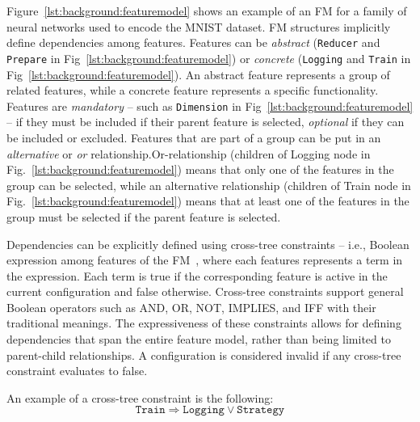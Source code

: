 Figure~\ref{lst:background:featuremodel} shows an example of an FM for a family of neural networks used to encode the MNIST dataset.
FM structures implicitly define dependencies among features. Features can be \textit{abstract} (\texttt{Reducer} and \texttt{Prepare} in Fig~\ref{lst:background:featuremodel}) or \textit{concrete} (\texttt{Logging} and \texttt{Train} in Fig~\ref{lst:background:featuremodel}).
An abstract feature represents a group of related features, while a concrete feature represents a specific functionality.
Features are \textit{mandatory} -- such as \texttt{Dimension} in Fig~\ref{lst:background:featuremodel} -- if they must be included if their parent feature is selected, \textit{optional} if they can be included or excluded.
Features that are part of a group can be put in an \textit{alternative} or \textit{or} relationship.Or-relationship (children of Logging node in Fig.~\ref{lst:background:featuremodel}) means that only one of the features in the group can be selected, while an alternative relationship (children of Train node in Fig.~\ref{lst:background:featuremodel}) means that at least one of the features in the group must be selected if the parent feature is selected.

Dependencies can be explicitly defined using cross-tree constraints -- i.e., Boolean expression among features of the FM~\cite{Cazzola22c}, where each features represents a term in the expression. Each term is true if the corresponding feature is active in the current configuration and false otherwise. Cross-tree constraints support general Boolean operators such as AND, OR, NOT, IMPLIES, and IFF with their traditional meanings.
The expressiveness of these constraints allows for defining dependencies that span the entire feature model, rather than being limited to parent-child relationships. A configuration is considered invalid if any cross-tree constraint evaluates to false.

An example of a cross-tree constraint is the following:
\begin{equation*}
    \texttt{Train} \Rightarrow \texttt{Logging} \vee \texttt{Strategy}
\end{equation*}

